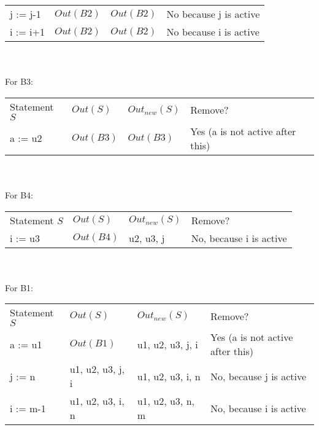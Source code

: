 \documentclass[12pt,fleqn]{article}		%
\begin{document}
\begin{enumerate}
\begin{tabularx}{\textwidth}{X X X X}
j := j-1 & $Out(B2)$ & $Out(B2)$ & No because j is active\\
i := i+1 & $Out(B2)$ & $Out(B2)$ & No because i is active\\
\end{tabularx}
\\\\
For B3:\\
\begin{tabularx}{\textwidth}{X X X X}
Statement $S$ & $Out(S)$ & $Out_{new}(S)$ & Remove?\\
a := u2 & $Out(B3)$ & $Out(B3)$ & Yes (a is not active after this)\\
\end{tabularx}
\\\\
For B4:\\
\begin{tabularx}{\textwidth}{X X X X}
Statement $S$ & $Out(S)$ & $Out_{new}(S)$ & Remove?\\
i := u3 & $Out(B4)$ & u2, u3, j & No, because i is active\\
\end{tabularx}
\\\\
For B1:\\
\begin{tabularx}{\textwidth}{X X X X}
Statement $S$ & $Out(S)$ & $Out_{new}(S)$ & Remove?\\
a := u1 & $Out(B1)$ & u1, u2, u3, j, i & Yes (a is not active after this)\\
j := n & u1, u2, u3, j, i & u1, u2, u3, i, n & No, because j is active\\
i := m-1 & u1, u2, u3, i, n & u1, u2, u3, n, m & No, because i is active
\end{tabularx}
\end{enumerate}
\end{document}
